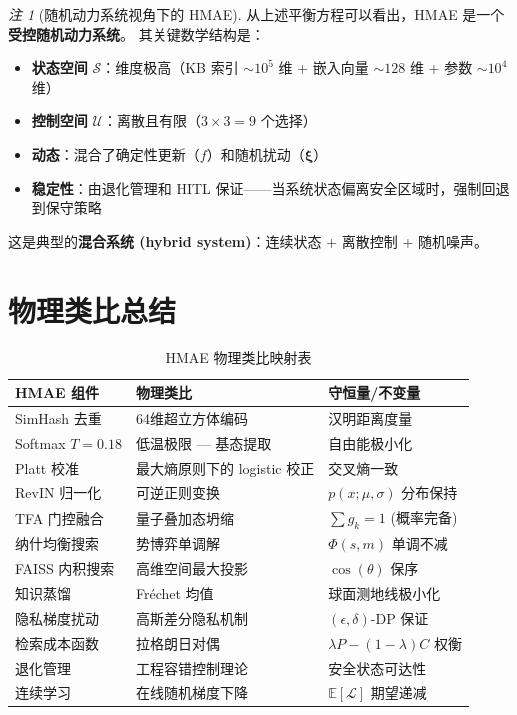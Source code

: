 \documentclass[11pt,a4paper]{ctexart}
\theoremstyle{remark}
\newtheorem{remark}{注}[section]
\begin{document}
\begin{remark}[随机动力系统视角下的 HMAE]
从上述平衡方程可以看出，HMAE 是一个\textbf{受控随机动力系统}。
其关键数学结构是：
\begin{itemize}[nosep]
\item \textbf{状态空间} $\mathcal{S}$：维度极高（KB 索引 $\sim 10^5$ 维 + 嵌入向量 $\sim 128$ 维 + 参数 $\sim 10^4$ 维）
\item \textbf{控制空间} $\mathcal{U}$：离散且有限（$3 \times 3 = 9$ 个选择）
\item \textbf{动态}：混合了确定性更新（$f$）和随机扰动（$\boldsymbol{\xi}$）
\item \textbf{稳定性}：由退化管理和 HITL 保证——当系统状态偏离安全区域时，强制回退到保守策略
\end{itemize}
这是典型的\textbf{混合系统 (hybrid system)}：连续状态 + 离散控制 + 随机噪声。
\end{remark}

\section{物理类比总结}

\begin{table}[H]
\centering
\small
\begin{tabular}{lll}
\toprule
\textbf{HMAE 组件} & \textbf{物理类比} & \textbf{守恒量/不变量} \\
\midrule
SimHash 去重 & 64维超立方体编码 & 汉明距离度量 \\
Softmax $T=0.18$ & 低温极限 — 基态提取 & 自由能极小化 \\
Platt 校准 & 最大熵原则下的 logistic 校正 & 交叉熵一致 \\
RevIN 归一化 & 可逆正则变换 & $p(x;\mu,\sigma)$ 分布保持 \\
TFA 门控融合 & 量子叠加态坍缩 & $\sum g_k = 1$ (概率完备) \\
纳什均衡搜索 & 势博弈单调解 & $\Phi(s,m)$ 单调不减 \\
FAISS 内积搜索 & 高维空间最大投影 & $\cos(\theta)$ 保序 \\
知识蒸馏 & Fr\'{e}chet 均值 & 球面测地线极小化 \\
隐私梯度扰动 & 高斯差分隐私机制 & $(\epsilon, \delta)$-DP 保证 \\
检索成本函数 & 拉格朗日对偶 & $\lambda P - (1-\lambda)C$ 权衡 \\
退化管理 & 工程容错控制理论 & 安全状态可达性 \\
连续学习 & 在线随机梯度下降 & $\mathbb{E}[\mathcal{L}]$ 期望递减 \\
\bottomrule
\end{tabular}
\caption{HMAE 物理类比映射表}
\end{table}
\end{document}
